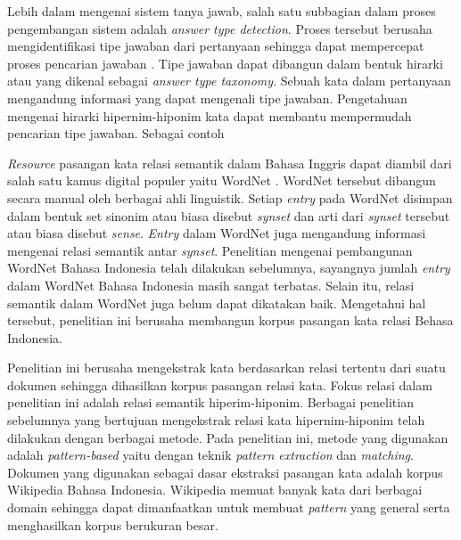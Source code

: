 Lebih dalam mengenai sistem tanya jawab, salah satu subbagian dalam proses pengembangan sistem adalah \textit{answer type detection}. Proses tersebut berusaha mengidentifikasi tipe jawaban dari pertanyaan sehingga dapat mempercepat proses pencarian jawaban \citep{jurafsky2000speech}. Tipe jawaban dapat dibangun dalam bentuk hirarki atau yang dikenal sebagai \textit{answer type taxonomy}. Sebuah kata dalam pertanyaan mengandung informasi yang dapat mengenali tipe jawaban. Pengetahuan mengenai hirarki hipernim-hiponim kata dapat membantu mempermudah pencarian tipe jawaban. Sebagai contoh

\textit{Resource} pasangan kata relasi semantik dalam Bahasa Inggris dapat diambil dari salah satu kamus digital populer yaitu WordNet \citep{miller1995wordnet}. WordNet tersebut dibangun secara manual oleh berbagai ahli linguistik. Setiap \textit{entry} pada WordNet disimpan dalam bentuk set sinonim atau biasa disebut \textit{synset} dan arti dari \textit{synset} tersebut atau biasa disebut \textit{sense}. \textit{Entry} dalam WordNet juga mengandung informasi mengenai relasi semantik antar \textit{synset}. Penelitian mengenai pembangunan WordNet Bahasa Indonesia telah dilakukan sebelumnya, sayangnya jumlah \textit{entry} dalam WordNet Bahasa Indonesia masih sangat terbatas. Selain itu, relasi semantik dalam WordNet juga belum dapat dikatakan baik. Mengetahui hal tersebut, penelitian ini berusaha membangun korpus pasangan kata relasi Behasa Indonesia.

Penelitian ini berusaha mengekstrak kata berdasarkan relasi tertentu dari suatu dokumen sehingga dihasilkan korpus pasangan relasi kata. Fokus relasi dalam penelitian ini adalah relasi semantik hiperim-hiponim. Berbagai penelitian sebelumnya yang bertujuan mengekstrak relasi kata hipernim-hiponim telah dilakukan dengan berbagai metode. Pada penelitian ini, metode yang digunakan adalah \textit{pattern-based} yaitu dengan teknik \textit{pattern extraction} dan \textit{matching}. Dokumen yang digunakan sebagai dasar ekstraksi pasangan kata adalah korpus Wikipedia Bahasa Indonesia. Wikipedia memuat banyak kata dari berbagai domain sehingga dapat dimanfaatkan untuk membuat \textit{pattern} yang general serta menghasilkan korpus berukuran besar.



